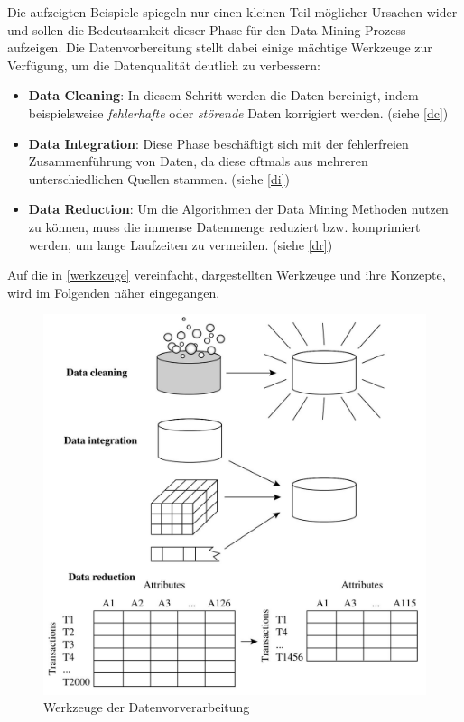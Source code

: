 Die aufzeigten Beispiele spiegeln nur einen kleinen Teil möglicher Ursachen wider und sollen die Bedeutsamkeit dieser Phase für den Data Mining Prozess aufzeigen. Die Datenvorbereitung stellt dabei einige mächtige Werkzeuge zur Verfügung, um die Datenqualität deutlich zu verbessern:

\begin{itemize}
\item \textbf{Data Cleaning}: In diesem Schritt werden die Daten bereinigt, indem beispielsweise \textit{fehlerhafte} oder \textit{störende} Daten korrigiert werden. (siehe \vref{dc})
\item \textbf{Data Integration}: Diese Phase beschäftigt sich mit der fehlerfreien Zusammenführung von Daten, da diese oftmals aus mehreren unterschiedlichen Quellen stammen. (siehe \vref{di})
\item \textbf{Data Reduction}: Um die Algorithmen der Data Mining Methoden nutzen zu können, muss die immense Datenmenge reduziert bzw. komprimiert werden, um lange Laufzeiten zu vermeiden. (siehe \vref{dr})
\end{itemize}

Auf die in \vref{werkzeuge} vereinfacht, dargestellten Werkzeuge und ihre Konzepte, wird im Folgenden näher eingegangen.

\begin{figure}[H]
\centering
\includegraphics[scale=1.2]{se-wa-jpg/preprocessing}
\caption[Werkzeuge der Datenvorverarbeitung]{Werkzeuge der Datenvorverarbeitung\protect\footnotemark}
\label{werkzeuge}
\end{figure}



